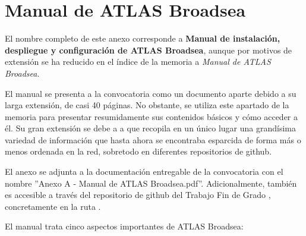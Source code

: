 \chapter{Manual de ATLAS Broadsea}\label{anexo:manual}

El nombre completo de este anexo corresponde a \textbf{Manual de instalación, despliegue y configuración de ATLAS Broadsea}, aunque por motivos de extensión se ha reducido en el índice de la memoria a \textit{Manual de ATLAS Broadsea}.

El manual se presenta a la convocatoria como un documento aparte debido a su larga extensión, de casi 40 páginas. No obstante, se utiliza este apartado de la memoria para presentar resumidamente sus contenidos básicos y cómo acceder a él. Su gran extensión se debe a a que recopila en un único lugar una grandísima variedad de información que hasta ahora se encontraba esparcida de forma más o menos ordenada en la red, sobretodo en diferentes repositorios de github. 

El anexo se adjunta a la documentación entregable de la convocatoria con el nombre ''Anexo A - Manual de ATLAS Broadsea.pdf''. Adicionalmente, también es accesible a través del repositorio de github del Trabajo Fin de Grado \cite{vallealonsodc}, concretamente en la ruta .


El manual trata cinco aspectos importantes de ATLAS Broadsea: 

